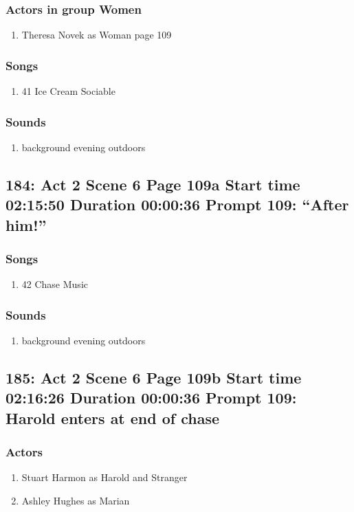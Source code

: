 \subsubsection{Actors in group Women}
\begin{enumerate}
\item Theresa Novek as Woman page 109
\end{enumerate}

\subsubsection{Songs}
\begin{enumerate}
\item 41 Ice Cream Sociable
\end{enumerate}\subsubsection{Sounds}
\begin{enumerate}
\item background evening outdoors
\end{enumerate}
\subsection{184: Act 2 Scene 6 Page 109a Start time 02:15:50 Duration 00:00:36 Prompt 109: ``After him!''}
\subsubsection{Songs}
\begin{enumerate}
\item 42 Chase Music
\end{enumerate}\subsubsection{Sounds}
\begin{enumerate}
\item background evening outdoors
\end{enumerate}
\subsection{185: Act 2 Scene 6 Page 109b Start time 02:16:26 Duration 00:00:36 Prompt 109: Harold enters at end of chase}

\subsubsection{Actors}
\begin{enumerate}
\item Stuart Harmon as Harold and Stranger
\item Ashley Hughes as Marian
\end{enumerate}

